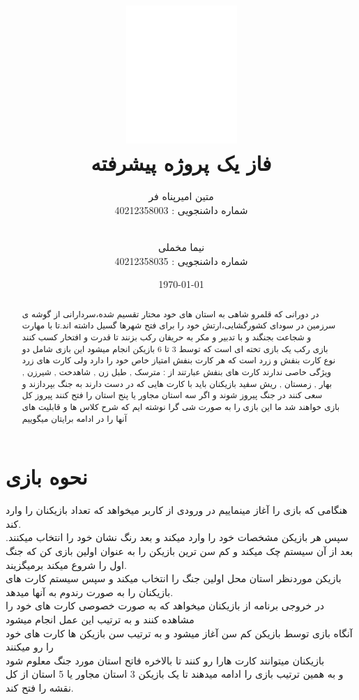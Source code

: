 \documentclass[pdf,titlepage,a4paper]{report}
\title{\includegraphics[scale=0.8]{Graphics/BASU_logo.png} \\ \Huge{فاز یک پروژه پیشرفته}}
\author{متین امیرپناه فر \\ شماره داشنجویی : 40212358003
		  \and \\ نیما مخملی \\ شماره داشنجویی : 40212358035}
\date{\today}
\begin{document}
	{\color{white}
	\maketitle}

	\tableofcontents

	\newpage

	\begin{abstract}
		
	در دورانی که قلمرو شاهی به استان های خود مختار تقسیم شده،سردارانی از گوشه ی سرزمین در سودای کشورگشایی،ارتش خود را برای فتح شهرها گسیل داشته اند.تا با مهارت و شجاعت بجنگند و با تدبیر و مکر به حریفان رکب بزنند تا قدرت و افتخار کسب کنند \\

     بازی رکب یک بازی تخته ای است که توسط 3 تا 6 بازیکن انجام میشود 
	 این بازی شامل دو نوع کارت بنفش و زرد است که هر کارت بنفش امتیاز خاص خود را دارد ولی کارت های زرد ویژگی خاصی ندارند
	 کارت های بنفش عبارتند از : مترسک , طبل زن , شاهدخت ,  شیرزن  ,  بهار  , زمستان , ریش سفید 
	 بازیکنان باید با کارت هایی که در دست دارند به جنگ بپردازند و سعی کنند در جنگ پیروز شوند و اگر سه استان مجاور یا پنج استان را فتح کنند پیروز کل بازی خواهند شد 
	 ما این بازی را به صورت شی گرا نوشته ایم که شرح کلاس ها و قابلیت های آنها را در ادامه برایتان میگوییم
	  
	\end{abstract}
    
	\newpage
    \part{نحوه بازی}
     هنگامی که بازی را آغاز مینماییم در ورودی از کاربر میخواهد که تعداد بازیکنان را وارد کند. \\
     \indent سپس هر بازیکن مشخصات خود را وارد میکند و بعد رنگ نشان خود را انتخاب میکنند.
	 بعد از آن سیستم چک میکند و کم سن ترین بازیکن را به عنوان اولین بازی کن که جنگ اول را شروع میکند برمیگزیند.\\
	 \indent بازیکن موردنظر استان محل اولین جنگ را انتخاب میکند و سپس سیستم کارت های بازیکنان را به صورت رندوم به آنها میدهد. \\
	 در خروجی برنامه از بازیکنان میخواهد که به صورت خصوصی کارت های خود را مشاهده کنند و به ترتیب این عمل انجام میشود\\
	 آنگاه بازی توسط بازیکن کم سن آغاز میشود و به ترتیب سن بازیکن ها کارت های خود را رو میکنند\\
	 بازیکنان میتوانند کارت هارا رو کنند تا بالاخره فاتح استان مورد جنگ معلوم شود\\
	 و به همین ترتیب بازی را ادامه میدهند تا یک بازیکن 3 استان مجاور یا 5 استان از کل نقشه را فتح کند.\\
	
\end{document}

